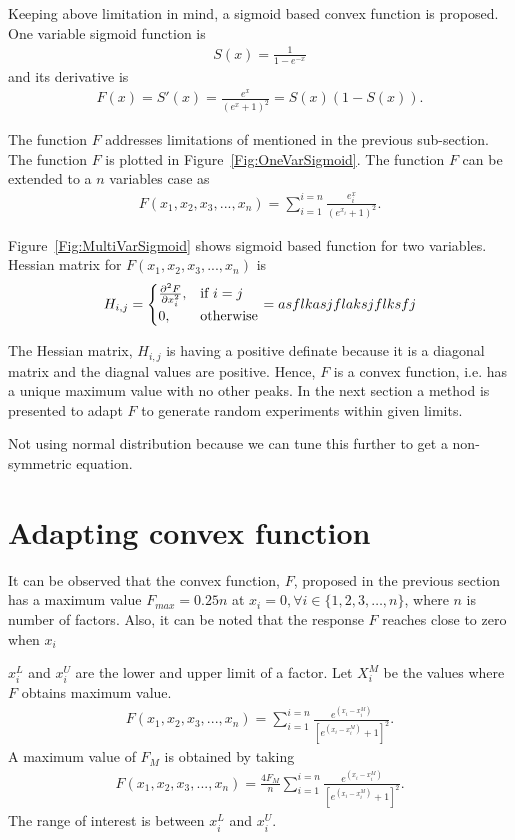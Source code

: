 \documentclass[letterpaper, 12pt]{article}
\begin{document}
Keeping above limitation in mind, a sigmoid based convex function is proposed. One variable sigmoid function is
\begin{eqnarray}
S(x) = \frac{1}{1-e^{-x}} \label{Eqn:Sigmoid}
\end{eqnarray}
and its derivative is
\begin{eqnarray}
F(x) = S'(x) = \frac{e^x}{(e^{x}+1)^2} = S(x)(1-S(x)). \label{Eqn:DiffSigmoid}
\end{eqnarray}
\par
The function $F$ addresses limitations of mentioned in the previous sub-section. The function $F$ is plotted in Figure~\ref{Fig:OneVarSigmoid}. The function $F$ can be extended to a $n$ variables case as
\begin{eqnarray}
F(x_1, x_2, x_3, ..., x_n) = \sum_{i=1}^{i=n}{\frac{e^x_i}{(e^{x_i}+1)^2}}. \label{Eqn:DiffSigmoidMulti}
\end{eqnarray}
\par
Figure~\ref{Fig:MultiVarSigmoid} shows sigmoid based function for two variables. Hessian matrix for $F(x_1, x_2, x_3, ..., x_n)$ is 
\begin{eqnarray}
H_{i,j} = 
\begin{cases}
\pdv[2]{F}{x_i},& \text{if } i = j\\
0,              & \text{otherwise}
\end{cases}
= asflkasjflaksjflksfj \label{Eqn:HessianMatrix}
\end{eqnarray}
\par
The Hessian matrix, $H_{i,j}$ is having a positive definate because it is a diagonal matrix and the diagnal values are positive. Hence, $F$ is a convex function, i.e. has a unique maximum value with no other peaks. In the next section a method is presented to adapt $F$ to generate random experiments within given limits.
\par
Not using normal distribution because we can tune this further to get a non-symmetric equation.
\section{Adapting convex function}
It can be observed that the convex function, $F$, proposed in the previous section has a maximum value $F_{max}=0.25n$ at $x_i=0, \forall i\in\{1, 2, 3, \dots, n\}$, where $n$ is number of factors. Also, it can be noted that the response $F$ reaches close to zero when $x_i$
\par
$x_i^L$ and $x_i^U$ are the lower and upper limit of a factor. Let $X_i^M$ be the values where $F$ obtains maximum value.
\begin{eqnarray}
	F(x_1, x_2, x_3, ..., x_n) = \sum_{i=1}^{i=n}{\frac{e^{(x_i-x_i^M)}}{[e^{(x_i-x_i^M)}+1]^2}}. \label{Eqn:DiffSigmoidMultiChangeMaxPoint}
\end{eqnarray}
A maximum value of $F_M$ is obtained by taking
\begin{eqnarray}
	F(x_1, x_2, x_3, ..., x_n) = \frac{4F_M}{n}\sum_{i=1}^{i=n}{\frac{e^{(x_i-x_i^M)}}{[e^{(x_i-x_i^M)}+1]^2}}. \label{Eqn:DiffSigmoidMultiChangeMaxValue}
\end{eqnarray}
The range of interest is between $x_i^L$ and $x_i^U$.




\end{document}
